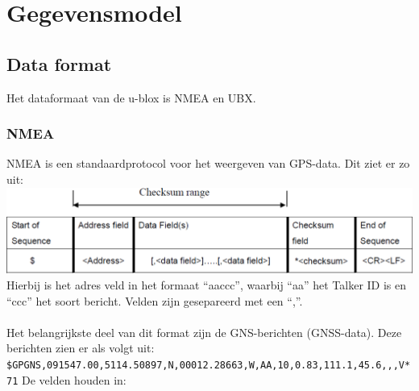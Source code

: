 \section{Gegevensmodel}
\subsection{Data format}
Het dataformaat van de u-blox is NMEA en UBX.

\subsubsection{NMEA}
NMEA is een standaardprotocol voor het
weergeven van GPS-data. Dit ziet er zo uit: \\
\includegraphics[width=\textwidth]{technical/nmea}
\\Hierbij is het adres veld in het formaat ``aaccc'', waarbij ``aa'' het
Talker ID is en ``ccc'' het soort bericht. Velden zijn gesepareerd met
een ``,''.
\citep{Navspark}\\\\
Het belangrijkste deel van dit format zijn de GNS-berichten
(GNSS-data). Deze berichten zien er als volgt uit:\\
\texttt{\$GPGNS,091547.00,5114.50897,N,00012.28663,W,AA,10,0.83,111.1,45.6,,,V*71}
\newpage
De velden houden in:
\\\\
